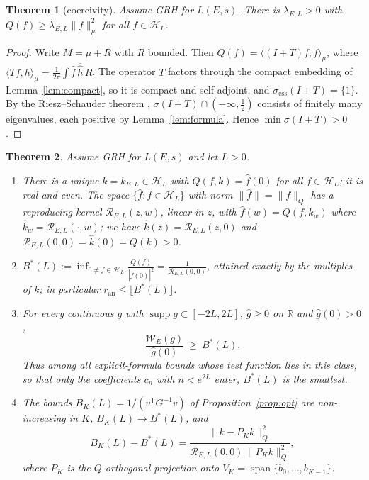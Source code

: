 \documentclass[11pt]{amsart}
\newtheorem{theorem}{Theorem}[section]
\theoremstyle{remark}
\theoremstyle{definition}
\newcommand{\R}{\mathbb{R}}
\newcommand{\Hs}{\mathcal{H}_L}
\newcommand{\Rad}{\mathcal{R}_{E,L}}
\newcommand{\ran}{r_{\mathrm{an}}}
\DeclareMathOperator{\supp}{supp}
\begin{document}
\begin{theorem}[coercivity]\label{thm:coercive}
Assume GRH for $L(E,s)$. There is $\lambda_{E,L}>0$ with $Q(f)\ge\lambda_{E,L}\|f\|_\mu^2$ for all $f\in\Hs$.
\end{theorem}
\begin{proof}
Write $M=\mu+R$ with $R$ bounded. Then $Q(f)=\langle(I+T)f,f\rangle_\mu$, where $\langle Tf,h\rangle_\mu=\frac1{2\pi}\int\hat f\,
\overline{\hat h}\,R$. The operator $T$ factors through the compact embedding of Lemma~\ref{lem:compact}, so it is compact and
self-adjoint, and $\sigma_{\mathrm{ess}}(I+T)=\{1\}$. By the Riesz--Schauder theorem \cite[Thm.~VI.15]{RS}, $\sigma(I+T)\cap(-\infty,\tfrac12)$ consists of finitely many
eigenvalues, each positive by Lemma~\ref{lem:formula}. Hence $\min\sigma(I+T)>0$.
\end{proof}

\begin{theorem}\label{thm:main}
Assume GRH for $L(E,s)$ and let $L>0$.
\begin{enumerate}[label=\textup{(\roman*)}]
\item There is a unique $k=k_{E,L}\in\Hs$ with $Q(f,k)=\hat f(0)$ for all $f\in\Hs$; it is real and even. The space
      $\{\hat f:f\in\Hs\}$ with norm $\|\hat f\|=\|f\|_Q$ has a reproducing kernel $\Rad(z,w)$, linear in $z$, with
      $\hat f(w)=Q(f,k_w)$ where $\hat k_w=\Rad(\cdot,w)$; we have $\hat k(z)=\Rad(z,0)$ and $\Rad(0,0)=\hat k(0)=Q(k)>0$.
\item $\displaystyle B^*(L):=\inf_{0\ne f\in\Hs}\frac{Q(f)}{|\hat f(0)|^2}=\frac1{\Rad(0,0)}$, attained exactly by the
      multiples of $k$; in particular $\ran\le\lfloor B^*(L)\rfloor$.
\item For every continuous $g$ with $\supp g\subset[-2L,2L]$, $\hat g\ge0$ on $\R$ and $\hat g(0)>0$,
      \[
        \frac{\mathcal W_E(g)}{\hat g(0)}\ \ge\ B^*(L).
      \]
      Thus among all explicit-formula bounds whose test function lies in this class, so that only the coefficients
      $c_n$ with $n<e^{2L}$ enter, $B^*(L)$ is the smallest.
\item The bounds $B_K(L)=1/(v^{\mathsf T}G^{-1}v)$ of Proposition~\ref{prop:opt} are non-increasing in $K$, $B_K(L)\to B^*(L)$, and
      \[
        B_K(L)-B^*(L)=\frac{\|k-P_Kk\|_Q^2}{\Rad(0,0)\,\|P_Kk\|_Q^2},
      \]
      where $P_K$ is the $Q$-orthogonal projection onto $V_K=\operatorname{span}\{b_0,\dots,b_{K-1}\}$.
\end{enumerate}
\end{theorem}
\end{document}
